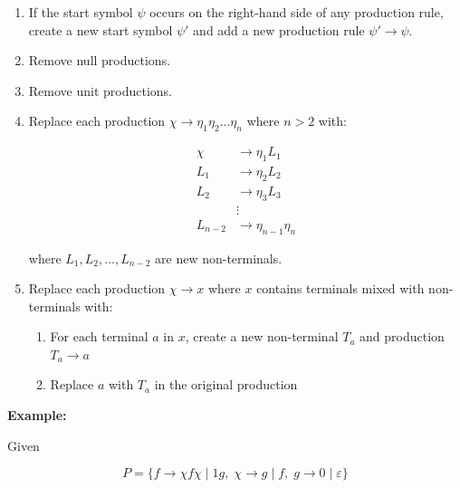 \documentclass[12pt,a4paper,openany]{article}
\begin{document}
\begin{enumerate}
    \item If the start symbol $\psi$ occurs on the right-hand side of any production rule, create a new start symbol $\psi'$ and add a new production rule $\psi' \to \psi$.
    
    \item Remove null productions.
    
    \item Remove unit productions.
    
    \item Replace each production $\chi \to \eta_1 \eta_2 \ldots \eta_n$ where $n > 2$ with:
    
    \begin{align*}
        \chi &\to \eta_1 L_1 \\
        L_1 &\to \eta_2 L_2 \\
        L_2 &\to \eta_3 L_3 \\
        &\vdots \\
        L_{n-2} &\to \eta_{n-1} \eta_n
    \end{align*}
    
    where $L_1, L_2, \ldots, L_{n-2}$ are new non-terminals.
    
    \item Replace each production $\chi \to x$ where $x$ contains terminals mixed with non-terminals with:
    
    \begin{enumerate}
        \item For each terminal $a$ in $x$, create a new non-terminal $T_a$ and production $T_a \to a$
        \item Replace $a$ with $T_a$ in the original production
    \end{enumerate}
\end{enumerate}

\textbf{Example: }

Given 

\[
P = \{f \to \chi f \chi \mid 1g,\; \chi \to g \mid f,\; g \to 0 \mid \varepsilon \}
\]
\end{document}
